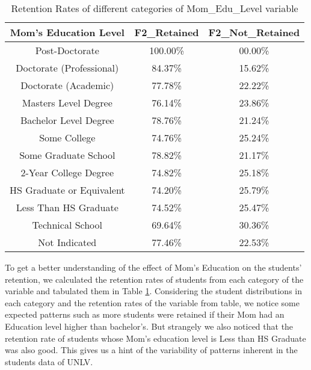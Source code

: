 \documentclass[11pt,openright]{report}
\begin{document}
\begin{table}[!t]
	\renewcommand{\arraystretch}{1.3}
	\caption{Retention Rates of different categories of Mom\_Edu\_Level variable}
	\label{table:mom_edu_retentions}
	\centering
	\begin{tabular}{|c|c|c|}
		\hline
		\bfseries Mom's Education Level & \bfseries F2\_Retained & \bfseries F2\_Not\_Retained\\
		\hline
		Post-Doctorate  & 100.00\%  & 00.00\% \\ \hline
		Doctorate (Professional) & 84.37\% &  15.62\% \\ \hline
		Doctorate (Academic) & 77.78\% & 22.22\% \\ \hline
		Masters Level Degree    &   76.14\% &  23.86\% \\ \hline
		Bachelor Level Degree &  78.76\%  & 21.24\% \\ \hline
		Some College & 74.76\% & 25.24\% \\ \hline
		Some Graduate School  & 78.82\% &  21.17\% \\ \hline
		2-Year College Degree    &  74.82\%  & 25.18\% \\ \hline
		HS Graduate or Equivalent  & 74.20\% &  25.79\% \\ \hline
		Less Than HS Graduate     & 74.52\% &  25.47\% \\ \hline
		Technical School  &         69.64\% &  30.36\% \\ \hline
		Not Indicated         &    77.46\% & 22.53\% \\ \hline
	\end{tabular}
\end{table}



To get a better understanding of the effect of Mom's Education on the students' retention, we calculated the retention rates of students from each category of the variable and tabulated them in Table \ref{table:mom_edu_retentions}. Considering the student distributions in each category and the retention rates of the variable from table, we notice some expected patterns such as more students were retained if their Mom had an Education level higher than bachelor's. But strangely we also noticed that the retention rate of students whose Mom's education level is Less than HS Graduate was also good. This gives us a hint of the variability of patterns inherent in the students data of UNLV.
\end{document}
